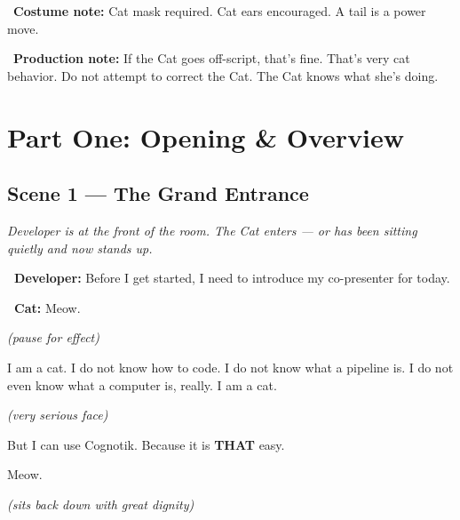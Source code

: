 \documentclass[12pt, letterpaper]{article}
\newcommand{\dev}{\textbf{\color{cogblue}\faIcon{laptop-code}\ Developer:}}
\newcommand{\cat}{\textbf{\color{catpink}\faIcon{cat}\ Cat:}}
\newcommand{\stage}[1]{%
    \begin{stagebox}%
      \textit{\color{black!60}#1}%
    \end{stagebox}%
  }
\begin{document}
  \begin{notebox}
    \ \textbf{Costume note:} Cat mask required. Cat ears encouraged.
    A tail is a power move.
  \end{notebox}

  \begin{notebox}
    \ \textbf{Production note:} If the Cat goes off-script, that's fine.
    That's very cat behavior. Do not attempt to correct the Cat. The Cat knows what
    she's doing.
  \end{notebox}

  \newpage

  \section{Part One: Opening \& Overview}

  \subsection{Scene 1 — The Grand Entrance}

  \stage{Developer is at the front of the room. The Cat enters — or has been
  sitting quietly and now stands up.}

  \begin{developerbox}
    \dev{} Before I get started, I need to introduce my co-presenter for today.
  \end{developerbox}

  \begin{catbox}
    \cat{} \large Meow.

    \medskip
    {\large\textit{(pause for effect)}}

    \medskip
    {\large
    I am a cat. I do not know how to code. I do not know what a pipeline is.
    I do not even know what a computer is, really. I am a cat.}

    \medskip
    {\large\textit{(very serious face)}}

    \medskip
    {\large
    But I can use Cognotik. Because it is \textbf{THAT} easy.}

    \medskip
    {\large Meow.}

    \medskip
    {\large\textit{(sits back down with great dignity)}}
  \end{catbox}
\end{document}
